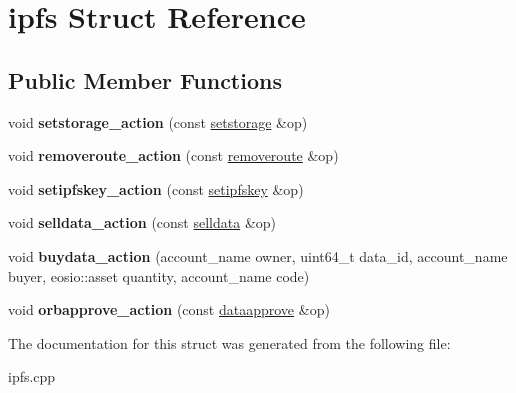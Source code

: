 \hypertarget{structipfs}{}\section{ipfs Struct Reference}
\label{structipfs}
\subsection*{Public Member Functions}
\begin{DoxyCompactItemize}
\item 
\mbox{\label{structipfs_ac4c6ba378aa47314ba7ec21961b39f7a}} 
void {\bfseries setstorage\+\_\+action} (const \mbox{\hyperlink{structeosio_1_1setstorage}{setstorage}} \&op)
\item 
\mbox{\label{structipfs_a7a2b7ba4b4b318577c10408297cc697c}} 
void {\bfseries removeroute\+\_\+action} (const \mbox{\hyperlink{structeosio_1_1removeroute}{removeroute}} \&op)
\item 
\mbox{\label{structipfs_a2829b70d7eebe21b1a20ef7b72f18b03}} 
void {\bfseries setipfskey\+\_\+action} (const \mbox{\hyperlink{structeosio_1_1setipfskey}{setipfskey}} \&op)
\item 
\mbox{\label{structipfs_abac7f7f9ce0dbbc48dbce6016ce38b83}} 
void {\bfseries selldata\+\_\+action} (const \mbox{\hyperlink{structeosio_1_1selldata}{selldata}} \&op)
\item 
\mbox{\label{structipfs_a8a05fa7d6e2f5502c8e9cce05458ff81}} 
void {\bfseries buydata\+\_\+action} (account\+\_\+name owner, uint64\+\_\+t data\+\_\+id, account\+\_\+name buyer, eosio\+::asset quantity, account\+\_\+name code)
\item 
\mbox{\label{structipfs_a0359fdfed79aeb57093790fe6e446324}} 
void {\bfseries orbapprove\+\_\+action} (const \mbox{\hyperlink{structeosio_1_1dataapprove}{dataapprove}} \&op)
\end{DoxyCompactItemize}


The documentation for this struct was generated from the following file\+:\begin{DoxyCompactItemize}
\item 
ipfs.\+cpp\end{DoxyCompactItemize}
